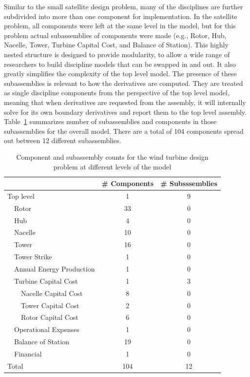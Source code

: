 \documentclass[]{aiaa-tc} %
\begin{document}
    Similar to the small satellite design problem, many of the disciplines are further
    subdivided into more than one component for implementation. In the
    satellite problem, all components were left at the same level in the model, but for this problem
    actual subassemblies of components were made (e.g., Rotor, Hub, Nacelle, Tower, Turbine Capital Cost,
    and Balance of Station). This highly nested structure is designed to provide modularity,
    to allow a wide range of researchers to build discipline models that can be swapped in and out.
    It also greatly simplifies the complexity of the top level model.
    The presence of these subassemblies is relevant to how the derivatives are computed.
    They are treated as single discipline components from the perspective of the top level model,
    meaning that when derivatives are requested from the assembly, it will internally solve
    for its own boundary derivatives and report them to the top level assembly. Table~\ref{tab:wt_comp_counts}
    summarizes number of subassemblies and components in those subassemblies for the overall model. There
    are a total of 104 components spread out between 12 different subassemblies.

    \begin{table}\centering
      \caption{Component and subassembly counts for the wind turbine design problem at different levels of
      the model}
      \label{tab:wt_comp_counts}
      \begin{tabular}{l c c}
      \toprule
             & \# Components & \# Subsssemblies \\
      \midrule
      Top level & 1 & 9\\
      \ \  Rotor & 33 & 0\\
      \ \  Hub & 4 & 0\\
      \ \  Nacelle & 10 & 0 \\
      \ \  Tower & 16 & 0\\
      \ \ Tower Strike & 1 & 0 \\
      \ \  Annual Energy Production & 1 & 0 \\
      \ \  Turbine Capital Cost & 1 & 3  \\
      \ \ \ \ Nacelle Capital Cost & 8 & 0  \\
      \ \ \ \ Tower Capital Cost & 2 & 0 \\
      \ \ \ \ Rotor Capital Cost & 6 & 0  \\
      \ \  Operational Expenses & 1 & 0  \\
      \ \  Balance of Station & 19 & 0 \\
      \ \  Financial & 1 & 0 \\
      \hline
      Total & 104 & 12 \\

      \bottomrule
      \end{tabular}
    \end{table}
\end{document}
